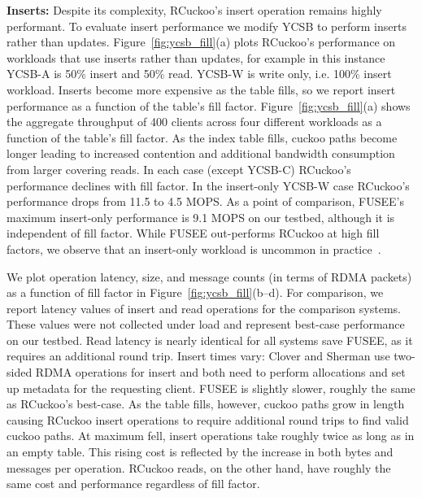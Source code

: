 \textbf{Inserts:}
Despite its complexity, RCuckoo's insert operation remains highly
performant.  To evaluate insert performance we modify YCSB to perform
inserts rather than updates.  Figure~\ref{fig:ycsb_fill}(a) plots
RCuckoo's performance on workloads that use inserts rather than
updates, for example in this instance YCSB-A is 50\% insert and 50\%
read. YCSB-W is write only, i.e. 100\% insert workload.  Inserts become
more expensive as the table fills, so we report insert performance as
a function of the table's fill factor.
Figure~\ref{fig:ycsb_fill}(a) shows the aggregate throughput
of 400 clients across four different workloads as a function
of the table's fill factor.  As the index table fills,
cuckoo paths become longer leading to increased contention
and additional bandwidth consumption from larger covering
reads. In each case (except YCSB-C) RCuckoo's performance
declines with fill factor. In the insert-only YCSB-W case
RCuckoo's performance drops from 11.5 to 4.5 MOPS.  As a
point of comparison, FUSEE's maximum insert-only performance
is 9.1 MOPS on our testbed, although it is independent of
fill factor.  While FUSEE out-performs RCuckoo at high fill
factors, we observe that an insert-only workload is uncommon
in practice~\cite{facebook-memcached}.

We plot operation latency, size, and message counts (in
terms of RDMA packets) as a function of fill factor in
Figure~\ref{fig:ycsb_fill}(b--d).  For comparison, we report
latency values of insert and read operations for the
comparison systems. These values were not collected under
load and represent best-case performance on our testbed.
Read latency is nearly identical for all systems save FUSEE,
as it requires an additional round trip.  Insert times vary:
Clover and Sherman use two-sided RDMA operations for insert
and both need to perform allocations and set up metadata for
the requesting client.  FUSEE is slightly slower, roughly
the same as RCuckoo's best-case.  As the table fills,
however, cuckoo paths grow in length causing RCuckoo insert
operations to require additional round trips to find valid
cuckoo paths.  At maximum fell, insert operations take
roughly twice as long as in an empty table. This rising cost
is reflected by the increase in both bytes and messages per
operation.  RCuckoo reads, on the other hand, have roughly
the same cost and performance regardless of fill factor.



